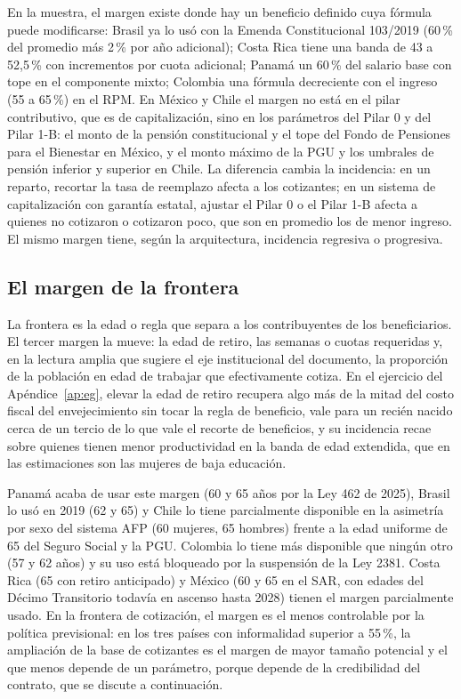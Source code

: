 \documentclass[12pt, letterpaper]{article}
\begin{document}
En la muestra, el margen existe donde hay un beneficio definido cuya fórmula puede
modificarse: Brasil ya lo usó con la Emenda Constitucional 103/2019 (60\,\% del
promedio más 2\,\% por año adicional); Costa Rica tiene una banda de 43 a 52,5\,\%
con incrementos por cuota adicional; Panamá un 60\,\% del salario base con tope en
el componente mixto; Colombia una fórmula decreciente con el ingreso (55 a 65\,\%)
en el RPM. En México y Chile el margen no está en el pilar contributivo, que es de
capitalización, sino en los parámetros del Pilar 0 y del Pilar 1-B: el monto de la
pensión constitucional y el tope del Fondo de Pensiones para el Bienestar en
México, y el monto máximo de la PGU y los umbrales de pensión inferior y superior
en Chile. La diferencia cambia la incidencia: en un reparto,
recortar la tasa de reemplazo afecta a los cotizantes; en un sistema de
capitalización con garantía estatal, ajustar el Pilar 0 o el Pilar 1-B afecta a
quienes no cotizaron o cotizaron poco, que son en promedio los de menor ingreso.
El mismo margen tiene, según la arquitectura, incidencia regresiva o progresiva.

\subsection{El margen de la frontera}

La frontera es la edad o regla que separa a los contribuyentes de los
beneficiarios. El tercer margen la mueve: la edad de retiro, las semanas o cuotas
requeridas y, en la lectura amplia que sugiere el eje institucional del documento,
la proporción de la población en edad de trabajar que efectivamente cotiza. En el ejercicio del Apéndice~\ref{ap:eg}, elevar la edad de
retiro recupera algo más de la mitad del costo fiscal del envejecimiento sin tocar
la regla de beneficio, vale para un recién nacido cerca de un tercio de lo que
vale el recorte de beneficios, y su incidencia recae sobre quienes tienen menor
productividad en la banda de edad extendida, que en las estimaciones son las
mujeres de baja educación.

Panamá acaba de usar este margen (60 y 65 años por la Ley 462 de 2025), Brasil lo
usó en 2019 (62 y 65) y Chile lo tiene parcialmente disponible en la asimetría por
sexo del sistema AFP (60 mujeres, 65 hombres) frente a la edad uniforme de 65 del
Seguro Social y la PGU. Colombia lo tiene más disponible que ningún otro (57 y 62
años) y su uso está bloqueado por la suspensión de la Ley 2381. Costa Rica (65 con
retiro anticipado) y México (60 y 65 en el SAR, con edades del Décimo Transitorio
todavía en ascenso hasta 2028) tienen el margen parcialmente usado. En la frontera
de cotización, el margen es el menos controlable por la política previsional: en
los tres países con informalidad superior a 55\,\%,
la ampliación de la base de cotizantes es el margen de mayor tamaño potencial y el
que menos depende de un parámetro, porque depende de la credibilidad del contrato,
que se discute a continuación.
\end{document}
